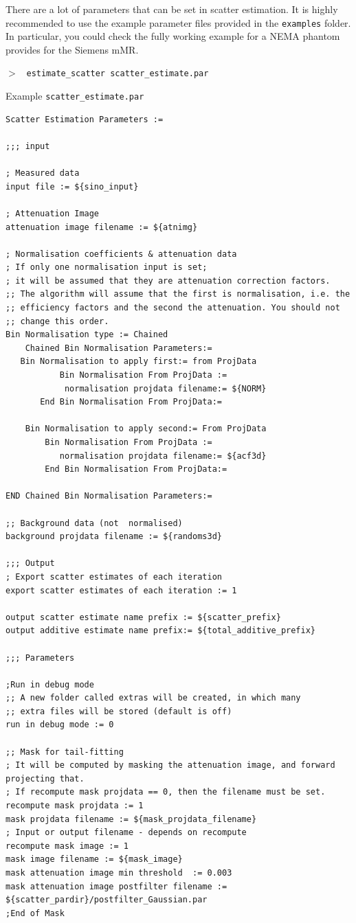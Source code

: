 \documentclass{article}
\newcommand{\cmdline}[1]{\par \noindent $>$ \texttt{#1}\par}
\begin{document}
There are a lot of parameters that can be set in scatter estimation. It is highly recommended to use
the example parameter files provided in the \texttt{examples} folder. In particular, you could check
the fully working example for a NEMA phantom provides for the Siemens mMR.

\cmdline{%
estimate\_scatter scatter\_estimate.par}
Example \texttt{scatter\_estimate.par}
\begin{verbatim}
Scatter Estimation Parameters :=

;;; input

; Measured data
input file := ${sino_input}

; Attenuation Image
attenuation image filename := ${atnimg}

; Normalisation coefficients & attenuation data
; If only one normalisation input is set; 
; it will be assumed that they are attenuation correction factors. 
;; The algorithm will assume that the first is normalisation, i.e. the 
;; efficiency factors and the second the attenuation. You should not 
;; change this order. 
Bin Normalisation type := Chained
	Chained Bin Normalisation Parameters:=
   Bin Normalisation to apply first:= from ProjData
           Bin Normalisation From ProjData :=
            normalisation projdata filename:= ${NORM}
       End Bin Normalisation From ProjData:=

	Bin Normalisation to apply second:= From ProjData
		Bin Normalisation From ProjData :=
           normalisation projdata filename:= ${acf3d}
        End Bin Normalisation From ProjData:=
		
END Chained Bin Normalisation Parameters:=

;; Background data (not  normalised)
background projdata filename := ${randoms3d}

;;; Output
; Export scatter estimates of each iteration 
export scatter estimates of each iteration := 1

output scatter estimate name prefix := ${scatter_prefix}
output additive estimate name prefix:= ${total_additive_prefix}

;;; Parameters

;Run in debug mode
;; A new folder called extras will be created, in which many 
;; extra files will be stored (default is off)
run in debug mode := 0

;; Mask for tail-fitting
; It will be computed by masking the attenuation image, and forward projecting that.
; If recompute mask projdata == 0, then the filename must be set.
recompute mask projdata := 1
mask projdata filename := ${mask_projdata_filename}
; Input or output filename - depends on recompute  
recompute mask image := 1
mask image filename := ${mask_image}
mask attenuation image min threshold  := 0.003
mask attenuation image postfilter filename := ${scatter_pardir}/postfilter_Gaussian.par
;End of Mask


\end{verbatim}
\end{document}
